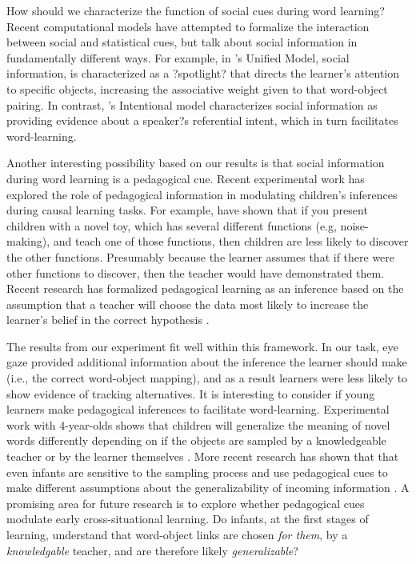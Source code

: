 \documentclass[man]{apa2}
\begin{document}
How should we characterize the function of social cues during word learning? Recent computational models have attempted to formalize the interaction between social and statistical cues, but talk about social information in fundamentally different ways. For example, in 's Unified Model, social information, is characterized as a ?spotlight? that directs the learner's attention to specific objects, increasing the associative weight given to that word-object pairing.  In contrast, 's Intentional model characterizes social information as providing evidence about a speaker?s referential intent, which in turn facilitates word-learning.

Another interesting possibility based on our results is that social information during word learning is a pedagogical cue. Recent experimental work has explored the role of pedagogical information in modulating children's inferences during causal learning tasks. For example,  have shown that if you present children with a novel toy, which has several different functions (e.g, noise-making), and teach one of those functions, then children are less likely to discover the other functions. Presumably because the learner assumes that if there were other functions to discover, then the teacher would have demonstrated them.  Recent research has formalized pedagogical learning as an inference based on the assumption that a teacher will choose the data most likely to increase the learner's belief in the correct hypothesis \cite{shafto2012learning}. 

The results from our experiment fit well within this framework. In our task, eye gaze provided additional information about the inference the learner should make (i.e., the correct word-object mapping), and as a result learners were less likely to show evidence of tracking alternatives. It is interesting to consider if young learners make pedagogical inferences to facilitate word-learning. Experimental work with 4-year-olds shows that children will generalize the meaning of novel words differently depending on if the objects are sampled by a knowledgeable teacher or by the learner themselves \cite{xu2007sampling}. More recent research has shown that that even infants are sensitive to the sampling process \cite{} and use pedagogical cues to make different assumptions about the generalizability of incoming information \cite{csibra2009natural}. A promising area for future research is to explore whether pedagogical cues modulate early cross-situational learning. Do infants, at the first stages of learning, understand that word-object links are chosen  \emph{for them}, by a \emph{knowledgable} teacher, and are therefore likely \emph{generalizable}?
\end{document}
